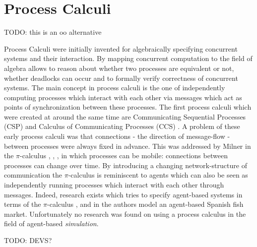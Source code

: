 \section{Process Calculi}
TODO: this is an oo alternative

Process Calculi were initially invented for algebraically specifying concurrent systems and their interaction. By mapping concurrent computation to the field of algebra allows to reason about whether two processes are equivalent or not, whether deadlocks can occur and to formally verify correctness of concurrent systems. The main concept in process calculi is the one of independently computing processes which interact with each other via messages which act as points of synchronization between these processes. The first process calculi which were created at around the same time are Communicating Sequential Processes (CSP) \cite{hoare_communicating_1985} and Calculus of Communicating Processes (CCS) \cite{milner_calculus_1980}. A problem of these early process calculi was that connections - the direction of message-flow - between processes were always fixed in advance. This was addressed by Milner in the $\pi$-calculus \cite{milner_calculus_1992}, \cite{milner_calculus_1992-1}, \cite{milner_elements_1993}, \cite{milner_communicating_1999} in which processes can be mobile: connections between processes can change over time. 
By introducing a changing network-structure of communication the $\pi$-calculus is reminiscent to agents which can also be seen as independently running processes which interact with each other through messages. Indeed, research exists which tries to specify agent-based systems in terms of the $\pi$-calculus \cite{esterline_using_2001}, \cite{kawabe_nepi2programming_2000} and in \cite{padget_pi-calculus_1998} the authors model an agent-based Spanish fish market. Unfortunately no research was found on using a process calculus in the field of agent-based \textit{simulation}.

TODO: DEVS?